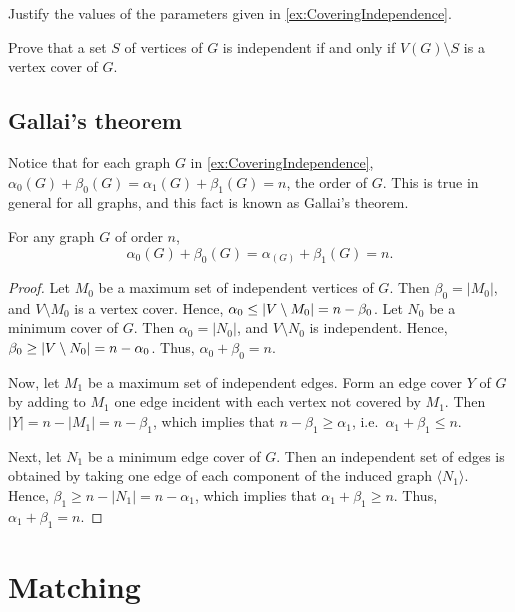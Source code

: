 \begin{Exercise}
Justify the values of the parameters given in \cref{ex:CoveringIndependence}.
\end{Exercise}

\begin{Exercise}
Prove that a set $S$ of vertices of $G$ is independent if and only if $V(G) \setminus S$ is a vertex cover of $G$.
\end{Exercise}

\subsection*{Gallai's theorem}
Notice that for each graph $G$ in \cref{ex:CoveringIndependence}, $\alpha_0(G) + \beta_0(G) = \alpha_1(G) + \beta_1(G) = n$, the order of $G$. This is true in general for all graphs, and this fact is known as Gallai's theorem.

\begin{Theorem}[Gallai]
For any graph $G$ of order $n$,
\begin{equation*}
\alpha_0(G) + \beta_0(G) = \alpha_(G) + \beta_1(G) = n.
\end{equation*}
\end{Theorem}

\begin{proof}
Let $M_0$ be a maximum set of independent vertices of $G$. Then $\beta_0 = |M_0|$, and $V \setminus M_0$ is a vertex cover. Hence, $\alpha_0 \le \vqty{V \setminus M_0} = n - \beta_0$. Let $N_0$ be a minimum cover of $G$. Then $\alpha_0 = |N_0|$, and $V \setminus N_0$ is independent. Hence, $\beta_0 \ge \vqty{V \setminus N_0} = n - \alpha_0$. Thus, $\alpha_0 + \beta_0 = n$.

Now, let $M_1$ be a maximum set of independent edges. Form an edge cover $Y$ of $G$ by adding to $M_1$ one edge incident with each vertex not covered by $M_1$. Then $|Y| = n - |M_1| = n - \beta_1$, which implies that $n - \beta_1 \ge \alpha_1$, i.e.\ $\alpha_1 + \beta_1 \le n$.

Next, let $N_1$ be a minimum edge cover of $G$. Then an independent set of edges is obtained by taking one edge of each component of the induced graph $\langle N_1 \rangle$. Hence, $\beta_1 \ge n - |N_1| = n - \alpha_1$, which implies that $\alpha_1 + \beta_1 \ge n$. Thus, $\alpha_1 + \beta_1 = n$.
\end{proof}


\section{Matching}\label{sec:Matching}

